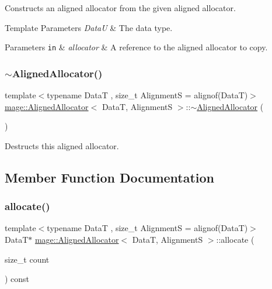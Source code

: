 Constructs an aligned allocator from the given aligned allocator.


\begin{DoxyTemplParams}{Template Parameters}
{\em DataU} & The data type. \\
\hline
\end{DoxyTemplParams}

\begin{DoxyParams}[1]{Parameters}
\mbox{\tt in}  & {\em allocator} & A reference to the aligned allocator to copy. \\
\hline
\end{DoxyParams}
\hypertarget{classmage_1_1_aligned_allocator_a98bda5c375a177eaa71cd622622451eb}{}\label{classmage_1_1_aligned_allocator_a98bda5c375a177eaa71cd622622451eb} 
\subsubsection{\texorpdfstring{$\sim$\+Aligned\+Allocator()}{~AlignedAllocator()}}
{\footnotesize\ttfamily template$<$typename DataT , size\+\_\+t AlignmentS = alignof(\+Data\+T)$>$ \\
\hyperlink{classmage_1_1_aligned_allocator}{mage\+::\+Aligned\+Allocator}$<$ DataT, AlignmentS $>$\+::$\sim$\hyperlink{classmage_1_1_aligned_allocator}{Aligned\+Allocator} (\begin{DoxyParamCaption}{ }\end{DoxyParamCaption})\hspace{0.3cm}{\ttfamily [default]}}

Destructs this aligned allocator. 

\subsection{Member Function Documentation}
\hypertarget{classmage_1_1_aligned_allocator_aa40b7eb431ac79e6b09bbd9e55906e78}{}\label{classmage_1_1_aligned_allocator_aa40b7eb431ac79e6b09bbd9e55906e78} 
\subsubsection{\texorpdfstring{allocate()}{allocate()}\hspace{0.1cm}{\footnotesize\ttfamily [1/2]}}
{\footnotesize\ttfamily template$<$typename DataT , size\+\_\+t AlignmentS = alignof(\+Data\+T)$>$ \\
DataT$\ast$ \hyperlink{classmage_1_1_aligned_allocator}{mage\+::\+Aligned\+Allocator}$<$ DataT, AlignmentS $>$\+::allocate (\begin{DoxyParamCaption}\item[{size\+\_\+t}]{count }\end{DoxyParamCaption}) const}

